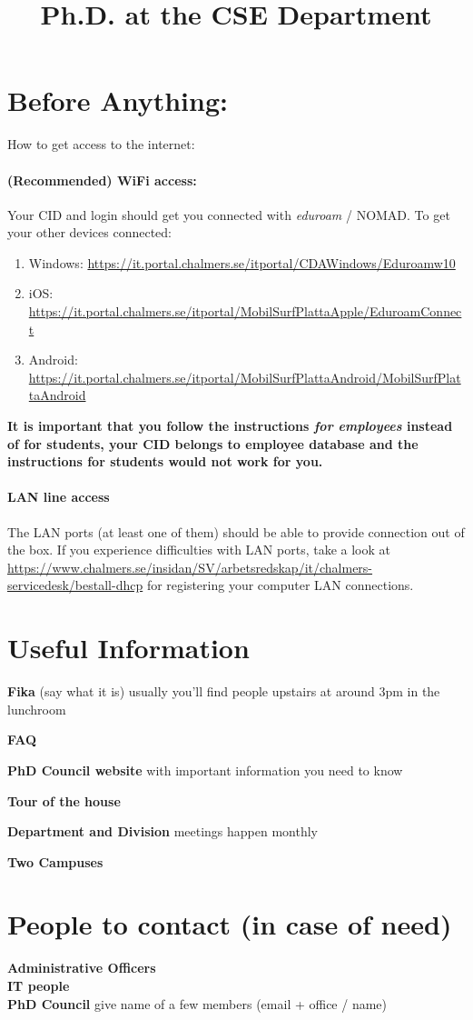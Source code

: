 \documentclass[10pt,a4paper,english]{article}
\title{Ph.D. at the CSE Department}
\begin{document}
\maketitle
\section*{Before Anything: }
How to get access to the internet:
\paragraph{(Recommended) WiFi access:}
  Your CID and login should get you connected with \emph{eduroam} / NOMAD.
  To get your other devices connected: 

  \begin{enumerate}
  \item   Windows: \url{https://it.portal.chalmers.se/itportal/CDAWindows/Eduroamw10}
  \item  iOS: \url{https://it.portal.chalmers.se/itportal/MobilSurfPlattaApple/EduroamConnect}
  \item  Android: \url{https://it.portal.chalmers.se/itportal/MobilSurfPlattaAndroid/MobilSurfPlattaAndroid}
  \end{enumerate}

  \textbf{It is important that you follow the instructions \emph{for employees} instead of for students, your CID belongs to employee database and the instructions for students would not work for you.}

\paragraph{LAN line access}
The LAN ports (at least one of them) should be able to provide connection out of the box. 
If you experience difficulties with LAN ports, take a look at \url{https://www.chalmers.se/insidan/SV/arbetsredskap/it/chalmers-servicedesk/bestall-dhcp} for registering your computer LAN connections. 

\section*{Useful Information}
\textbf{Fika} (say what it is) usually you'll find people upstairs at around 3pm in the lunchroom

\textbf{FAQ}


\textbf{PhD Council website} with important information you need to know 

\textbf{Tour of the house}

\textbf{Department and Division} meetings happen monthly

\textbf{Two Campuses}

\section*{People to contact (in case of need)}
\textbf{Administrative Officers}
\\
\textbf{IT people}
\\
\textbf{PhD Council} give name of a few members (email + office / name)
\end{document}
